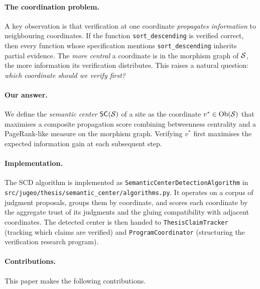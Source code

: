 \documentclass[11pt]{article}
\newcommand{\SC}{\mathsf{SC}}               %
\newcommand{\SCD}{\textsc{SCD}}             %
\begin{document}
\paragraph{The coordination problem.}
A key observation is that verification at one coordinate \emph{propagates
information} to neighbouring coordinates.  If the function
\lstinline|sort_descending| is verified correct, then every function
whose specification mentions \lstinline|sort_descending| inherits partial
evidence.  The \emph{more central} a coordinate is in the morphism
graph of $\mathcal{S}$, the more information its verification distributes.
This raises a natural question: \emph{which coordinate should we verify
first?}

\paragraph{Our answer.}
We define the \emph{semantic center} $\SC(\Site)$ of a site as the
coordinate $v^* \in \mathrm{Ob}(\mathcal{S})$ that maximises a composite propagation
score combining betweenness centrality and a PageRank-like measure on
the morphism graph.  Verifying $v^*$ first maximises the expected
information gain at each subsequent step.

\paragraph{Implementation.}
The \SCD{} algorithm is implemented as
\texttt{SemanticCenterDetectionAlgorithm} in
\texttt{src/jugeo/thesis/semantic\_center/algorithms.py}.  It operates
on a corpus of judgment proposals, groups them by coordinate, and
scores each coordinate by the aggregate trust of its judgments and the
gluing compatibility with adjacent coordinates.  The detected center is
then handed to \texttt{ThesisClaimTracker} (tracking which claims are
verified) and \texttt{ProgramCoordinator} (structuring the verification
research program).

\paragraph{Contributions.}
This paper makes the following contributions.
\end{document}
